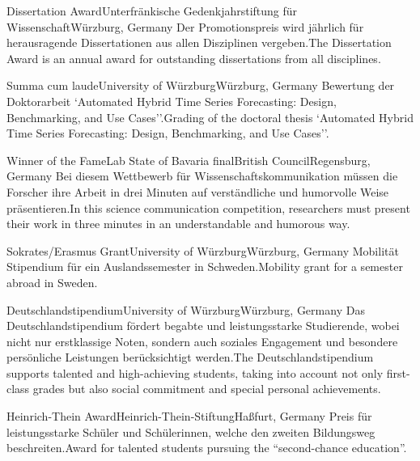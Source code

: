 \begin{cventries}
	{Dissertation Award}{Unterfränkische Gedenkjahrstiftung für Wissenschaft}{Würzburg, Germany}%
    {}%
    {Der Promotionspreis wird jährlich für herausragende Dissertationen aus allen Disziplinen vergeben.}{The Dissertation Award is an annual award for outstanding dissertations from all disciplines.}


	{Summa cum laude}{University of Würzburg}{Würzburg, Germany}%
    {}%
    {Bewertung der Doktorarbeit `Automated Hybrid Time Series Forecasting: Design, Benchmarking, and Use Cases''.}{Grading of the doctoral thesis `Automated Hybrid Time Series Forecasting: Design, Benchmarking, and Use Cases''.}

	{Winner of the FameLab State of Bavaria final}{British Council}{Regensburg, Germany}%
    {}%
    {Bei diesem Wettbewerb für Wissenschaftskommunikation müssen die Forscher ihre Arbeit in drei Minuten auf verständliche und humorvolle Weise präsentieren.}{In this science communication competition, researchers must present their work in three minutes in an understandable and humorous way.}

	{Sokrates/Erasmus Grant}{University of Würzburg}{Würzburg, Germany}%
    {}%
    {Mobilität Stipendium für ein Auslandssemester in Schweden.}{Mobility grant for a semester abroad in Sweden.}

	{Deutschlandstipendium}{University of Würzburg}{Würzburg, Germany}%
    {}%
    {Das Deutschlandstipendium fördert begabte und leistungsstarke Studierende, wobei nicht nur erstklassige Noten, sondern auch soziales Engagement und besondere persönliche Leistungen berücksichtigt werden.}{The Deutschlandstipendium supports talented and high-achieving students, taking into account not only first-class grades but also social commitment and special personal achievements.}

	{Heinrich-Thein Award}{Heinrich-Thein-Stiftung}{Haßfurt, Germany}%
    {}%
    {Preis für leistungsstarke Schüler und Schülerinnen, welche den zweiten Bildungsweg beschreiten.}{Award for talented students pursuing the ``second-chance education''.}

\end{cventries}